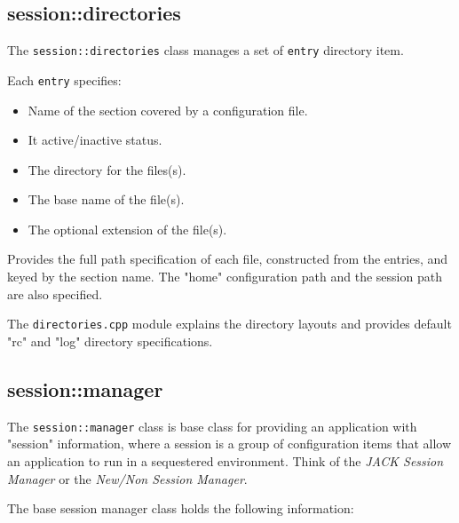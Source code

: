 \subsection{session::directories}
\label{subsec:session_namespace_directories}

   The \texttt{session::directories} class manages a set of
   \texttt{entry} directory item.

   Each \texttt{entry} specifies:

   \begin{itemize}
      \item Name of the section covered by a configuration file.
      \item It active/inactive status.
      \item The directory for the files(s).
      \item The base name of the file(s).
      \item The optional extension of the file(s).
   \end{itemize}

   Provides the full path specification of each file, constructed
   from the entries, and keyed by the section name.
   The "home" configuration path and the session path are also specified.

   The \texttt{directories.cpp} module explains the directory layouts
   and provides default "rc" and "log" directory specifications.

\subsection{session::manager}
\label{subsec:session_namespace_manager}

   The \texttt{session::manager} class is base class for providing an
   application with "session" information, where a session is a group of
   configuration items that allow an application to run in a sequestered
   environment. Think of the \textsl{JACK Session Manager} or the 
   \textsl{New/Non Session Manager}.

   The base session manager class holds the following information:

